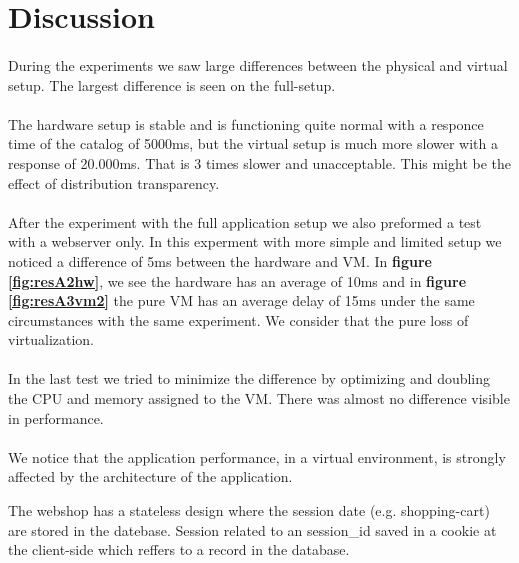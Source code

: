 \section{Discussion}
\paragraph{}
During the experiments we saw large differences between the physical and virtual setup. The largest difference is seen on the full-setup.

\paragraph{}
The hardware setup is stable and is functioning quite normal with a responce time of the catalog of 5000ms, but the virtual setup is much more slower with a response of 20.000ms. That is 3 times slower and unacceptable. This might be the effect of distribution transparency.

\paragraph{}
After the experiment with the full application setup we also preformed a test with a webserver only. In this experment with more simple and limited setup we noticed a difference of 5ms between the hardware and VM. In \textbf{figure \ref{fig:resA2hw}}, we see the hardware has an average of 10ms and in \textbf{figure \ref{fig:resA3vm2}} the pure VM has an average delay of 15ms under the same circumstances with the same experiment. We consider that the pure loss of virtualization.

\paragraph{}
In the last test we tried to minimize the difference by optimizing and doubling the CPU and memory assigned to the VM. There was almost no difference visible in performance.

\paragraph{}
We notice that the application performance, in a virtual environment, is strongly affected by the architecture of the application. \par
The webshop has a stateless design where the session date (e.g. shopping-cart) are stored in the datebase. Session related to an session\_id saved in a cookie at the client-side which reffers to a record in the database.